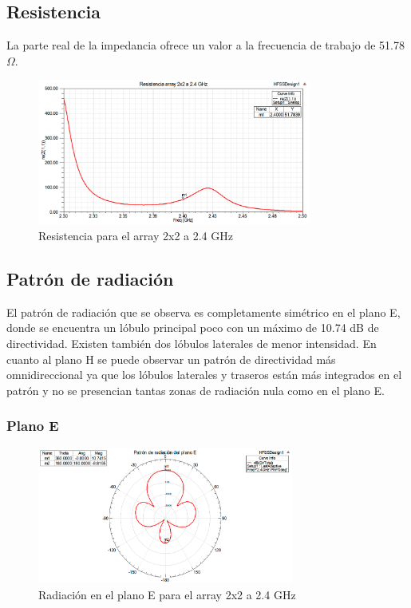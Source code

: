 \subsection{Resistencia}
\par La parte real de la impedancia ofrece un valor a la frecuencia de trabajo de 51.78 $\Omega$.
\\
\begin{figure}[H]
    \centering
        \includegraphics[width=0.8\textwidth]{archivos/analisis/2x21/3}
        \caption{Resistencia para el array 2x2 a 2.4 GHz}
        \label{fig:resis2x21}
\end{figure}

\subsection{Patrón de radiación}
\par El patrón de radiación que se observa es completamente simétrico en el plano E, donde se encuentra un lóbulo principal poco con un máximo de 10.74 dB de directividad. Existen también dos lóbulos laterales de menor intensidad. En cuanto al plano H se puede observar un patrón de directividad más omnidireccional ya que los lóbulos laterales y traseros están más integrados en el patrón y no se presencian tantas zonas de radiación nula como en el plano E. 
\\
\subsubsection{Plano E}
\begin{figure}[H]
    \centering
        \includegraphics[width=0.75\textwidth]{archivos/analisis/2x21/4}
        \caption{Radiación en el plano E para el array 2x2 a 2.4 GHz}
        \label{fig:E2x21}
\end{figure}

